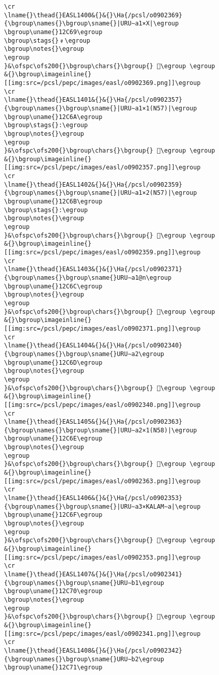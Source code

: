 \begin{verbatim}
\cr
\lname{}\thead{}EASL1400&{}&{}\Ha{/pcsl/o0902369}{\bgroup\names{}\bgroup\sname{}|URU∼a1×X|\egroup
\bgroup\uname{}12C69\egroup
\bgroup\stags{}﹟\egroup
\bgroup\notes{}\egroup
\egroup
}&\ofspc\ofs200{}\bgroup\chars{}\bgroup{} 𒱩\egroup \egroup
&{}\bgroup\imageinline{}[[img:src=/pcsl/pepc/images/easl/o0902369.png]]\egroup
\cr
\lname{}\thead{}EASL1401&{}&{}\Ha{/pcsl/o0902357}{\bgroup\names{}\bgroup\sname{}|URU∼a1×1(N57)|\egroup
\bgroup\uname{}12C6A\egroup
\bgroup\stags{}:\egroup
\bgroup\notes{}\egroup
\egroup
}&\ofspc\ofs200{}\bgroup\chars{}\bgroup{} 𒱪\egroup \egroup
&{}\bgroup\imageinline{}[[img:src=/pcsl/pepc/images/easl/o0902357.png]]\egroup
\cr
\lname{}\thead{}EASL1402&{}&{}\Ha{/pcsl/o0902359}{\bgroup\names{}\bgroup\sname{}|URU∼a1×2(N57)|\egroup
\bgroup\uname{}12C6B\egroup
\bgroup\stags{}:\egroup
\bgroup\notes{}\egroup
\egroup
}&\ofspc\ofs200{}\bgroup\chars{}\bgroup{} 𒱫\egroup \egroup
&{}\bgroup\imageinline{}[[img:src=/pcsl/pepc/images/easl/o0902359.png]]\egroup
\cr
\lname{}\thead{}EASL1403&{}&{}\Ha{/pcsl/o0902371}{\bgroup\names{}\bgroup\sname{}URU∼a1@n\egroup
\bgroup\uname{}12C6C\egroup
\bgroup\notes{}\egroup
\egroup
}&\ofspc\ofs200{}\bgroup\chars{}\bgroup{} 𒱬\egroup \egroup
&{}\bgroup\imageinline{}[[img:src=/pcsl/pepc/images/easl/o0902371.png]]\egroup
\cr
\lname{}\thead{}EASL1404&{}&{}\Ha{/pcsl/o0902340}{\bgroup\names{}\bgroup\sname{}URU∼a2\egroup
\bgroup\uname{}12C6D\egroup
\bgroup\notes{}\egroup
\egroup
}&\ofspc\ofs200{}\bgroup\chars{}\bgroup{} 𒱭\egroup \egroup
&{}\bgroup\imageinline{}[[img:src=/pcsl/pepc/images/easl/o0902340.png]]\egroup
\cr
\lname{}\thead{}EASL1405&{}&{}\Ha{/pcsl/o0902363}{\bgroup\names{}\bgroup\sname{}|URU∼a2×1(N58)|\egroup
\bgroup\uname{}12C6E\egroup
\bgroup\notes{}\egroup
\egroup
}&\ofspc\ofs200{}\bgroup\chars{}\bgroup{} 𒱮\egroup \egroup
&{}\bgroup\imageinline{}[[img:src=/pcsl/pepc/images/easl/o0902363.png]]\egroup
\cr
\lname{}\thead{}EASL1406&{}&{}\Ha{/pcsl/o0902353}{\bgroup\names{}\bgroup\sname{}|URU∼a3×KALAM∼a|\egroup
\bgroup\uname{}12C6F\egroup
\bgroup\notes{}\egroup
\egroup
}&\ofspc\ofs200{}\bgroup\chars{}\bgroup{} 𒱯\egroup \egroup
&{}\bgroup\imageinline{}[[img:src=/pcsl/pepc/images/easl/o0902353.png]]\egroup
\cr
\lname{}\thead{}EASL1407&{}&{}\Ha{/pcsl/o0902341}{\bgroup\names{}\bgroup\sname{}URU∼b1\egroup
\bgroup\uname{}12C70\egroup
\bgroup\notes{}\egroup
\egroup
}&\ofspc\ofs200{}\bgroup\chars{}\bgroup{} 𒱰\egroup \egroup
&{}\bgroup\imageinline{}[[img:src=/pcsl/pepc/images/easl/o0902341.png]]\egroup
\cr
\lname{}\thead{}EASL1408&{}&{}\Ha{/pcsl/o0902342}{\bgroup\names{}\bgroup\sname{}URU∼b2\egroup
\bgroup\uname{}12C71\egroup

\end{verbatim}
